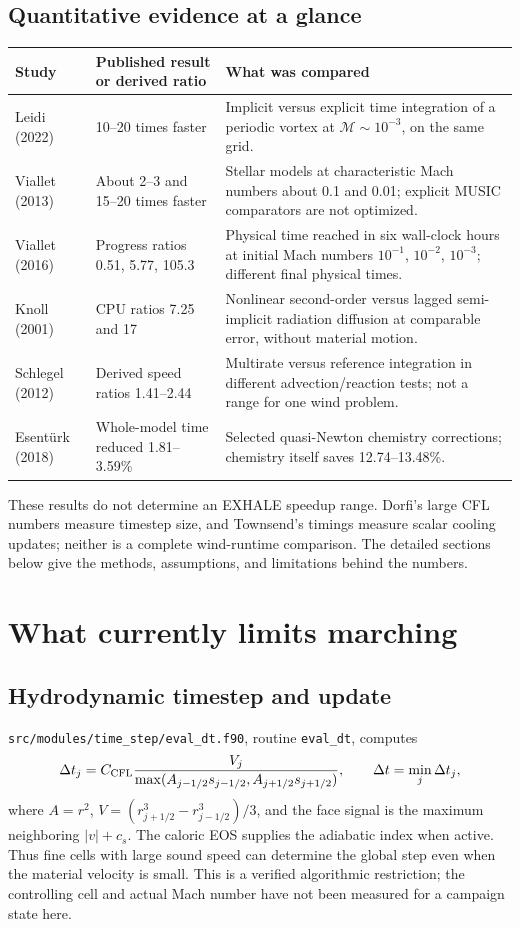 \documentclass[english,a4paper]{my_memo}
\newcommand{\code}[1]{\nolinkurl{#1}}
\begin{document}
\subsection{Quantitative evidence at a glance}
\begin{center}
\begin{tabularx}{\textwidth}{@{}p{}p{}X@{}}
\toprule
Study & Published result or derived ratio & What was compared\\
\midrule
Leidi (2022) & 10--20 times faster & Implicit versus explicit time integration of a periodic vortex at $\mathcal M\sim10^{-3}$, on the same grid.\\
Viallet (2013) & About 2--3 and 15--20 times faster & Stellar models at characteristic Mach numbers about 0.1 and 0.01; explicit MUSIC comparators are not optimized.\\
Viallet (2016) & Progress ratios 0.51, 5.77, 105.3 & Physical time reached in six wall-clock hours at initial Mach numbers $10^{-1}$, $10^{-2}$, $10^{-3}$; different final physical times.\\
Knoll (2001) & CPU ratios 7.25 and 17 & Nonlinear second-order versus lagged semi-implicit radiation diffusion at comparable error, without material motion.\\
Schlegel (2012) & Derived speed ratios 1.41--2.44 & Multirate versus reference integration in different advection/reaction tests; not a range for one wind problem.\\
Esent\"urk (2018) & Whole-model time reduced 1.81--3.59\% & Selected quasi-Newton chemistry corrections; chemistry itself saves 12.74--13.48\%.\\
\bottomrule
\end{tabularx}
\end{center}
These results do not determine an EXHALE speedup range. Dorfi's large CFL numbers measure timestep size, and Townsend's timings measure scalar cooling updates; neither is a complete wind-runtime comparison. The detailed sections below give the methods, assumptions, and limitations behind the numbers.

\section{What currently limits marching}
\subsection{Hydrodynamic timestep and update}
\code{src/modules/time_step/eval_dt.f90}, routine \code{eval_dt}, computes
\begin{equation}
 \Delta t_j=C_{\rm CFL}\frac{V_j}{\max(A_{j-1/2}s_{j-1/2},A_{j+1/2}s_{j+1/2})},
 \qquad \Delta t=\min_j\Delta t_j,
\end{equation}
where $A=r^2$, $V=(r_{j+1/2}^3-r_{j-1/2}^3)/3$, and the face signal is the maximum neighboring $|v|+c_s$. The caloric EOS supplies the adiabatic index when active. Thus fine cells with large sound speed can determine the global step even when the material velocity is small. This is a verified algorithmic restriction; the controlling cell and actual Mach number have not been measured for a campaign state here.
\end{document}
